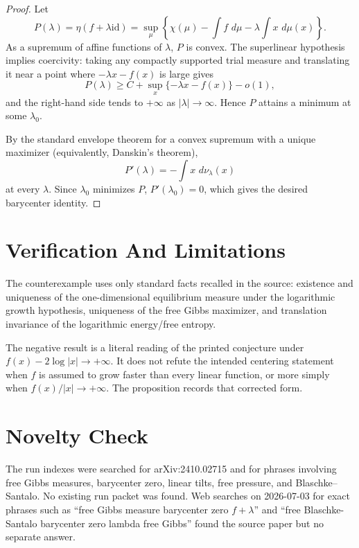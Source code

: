 \documentclass[11pt]{article}
\newcommand{\dd}{\,d}
\newcommand{\id}{\mathrm{id}}
\begin{document}
\begin{proof}
Let
\[
        P(\lambda)=\eta(f+\lambda\id)
        =\sup_\mu\left\{\chi(\mu)-\int f\,\dd\mu
        -\lambda\int x\,\dd\mu(x)\right\}.
\]
As a supremum of affine functions of \(\lambda\), \(P\) is convex. The
superlinear hypothesis implies coercivity: taking any compactly supported
trial measure and translating it near a point where \(-\lambda x-f(x)\) is
large gives
\[
        P(\lambda)\geq C+\sup_x\{-\lambda x-f(x)\}-o(1),
\]
and the right-hand side tends to \(+\infty\) as \(|\lambda|\to\infty\). Hence
\(P\) attains a minimum at some \(\lambda_0\).

By the standard envelope theorem for a convex supremum with a unique maximizer
(equivalently, Danskin's theorem),
\[
        P'(\lambda)=-\int x\,\dd\nu_\lambda(x)
\]
at every \(\lambda\). Since \(\lambda_0\) minimizes \(P\), \(P'(\lambda_0)=0\),
which gives the desired barycenter identity.
\end{proof}

\section*{Verification And Limitations}

The counterexample uses only standard facts recalled in the source: existence
and uniqueness of the one-dimensional equilibrium measure under the logarithmic
growth hypothesis, uniqueness of the free Gibbs maximizer, and translation
invariance of the logarithmic energy/free entropy.

The negative result is a literal reading of the printed conjecture under
\(f(x)-2\log|x|\to+\infty\). It does not refute the intended centering statement
when \(f\) is assumed to grow faster than every linear function, or more simply
when \(f(x)/|x|\to+\infty\). The proposition records that corrected form.

\section*{Novelty Check}

The run indexes were searched for arXiv:2410.02715 and for phrases involving
free Gibbs measures, barycenter zero, linear tilts, free pressure, and
Blaschke--Santalo. No existing run packet was found. Web searches on
2026-07-03 for exact phrases such as ``free Gibbs measure barycenter zero
\(f+\lambda\)'' and ``free Blaschke-Santalo barycenter zero lambda free Gibbs''
found the source paper but no separate answer.
\end{document}
